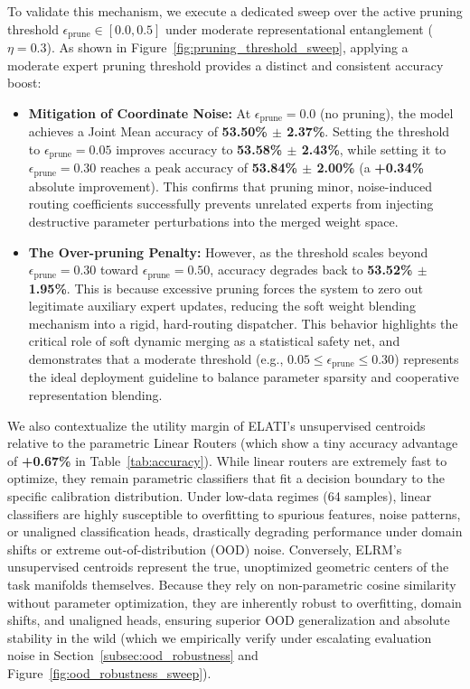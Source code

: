 To validate this mechanism, we execute a dedicated sweep over the active pruning threshold $\epsilon_{\text{prune}} \in [0.0, 0.5]$ under moderate representational entanglement ($\eta = 0.3$). As shown in Figure~\ref{fig:pruning_threshold_sweep}, applying a moderate expert pruning threshold provides a distinct and consistent accuracy boost:
\begin{itemize}
    \item \textbf{Mitigation of Coordinate Noise:} At $\epsilon_{\text{prune}} = 0.0$ (no pruning), the model achieves a Joint Mean accuracy of \textbf{53.50\% $\pm$ 2.37\%}. Setting the threshold to $\epsilon_{\text{prune}} = 0.05$ improves accuracy to \textbf{53.58\% $\pm$ 2.43\%}, while setting it to $\epsilon_{\text{prune}} = 0.30$ reaches a peak accuracy of \textbf{53.84\% $\pm$ 2.00\%} (a \textbf{+0.34\%} absolute improvement). This confirms that pruning minor, noise-induced routing coefficients successfully prevents unrelated experts from injecting destructive parameter perturbations into the merged weight space.
    \item \textbf{The Over-pruning Penalty:} However, as the threshold scales beyond $\epsilon_{\text{prune}} = 0.30$ toward $\epsilon_{\text{prune}} = 0.50$, accuracy degrades back to \textbf{53.52\% $\pm$ 1.95\%}. This is because excessive pruning forces the system to zero out legitimate auxiliary expert updates, reducing the soft weight blending mechanism into a rigid, hard-routing dispatcher. This behavior highlights the critical role of soft dynamic merging as a statistical safety net, and demonstrates that a moderate threshold (e.g., $0.05 \le \epsilon_{\text{prune}} \le 0.30$) represents the ideal deployment guideline to balance parameter sparsity and cooperative representation blending.
\end{itemize}

We also contextualize the utility margin of ELATI's unsupervised centroids relative to the parametric Linear Routers (which show a tiny accuracy advantage of \textbf{+0.67\%} in Table~\ref{tab:accuracy}). While linear routers are extremely fast to optimize, they remain parametric classifiers that fit a decision boundary to the specific calibration distribution. Under low-data regimes (64 samples), linear classifiers are highly susceptible to overfitting to spurious features, noise patterns, or unaligned classification heads, drastically degrading performance under domain shifts or extreme out-of-distribution (OOD) noise. Conversely, ELRM's unsupervised centroids represent the true, unoptimized geometric centers of the task manifolds themselves. Because they rely on non-parametric cosine similarity without parameter optimization, they are inherently robust to overfitting, domain shifts, and unaligned heads, ensuring superior OOD generalization and absolute stability in the wild (which we empirically verify under escalating evaluation noise in Section~\ref{subsec:ood_robustness} and Figure~\ref{fig:ood_robustness_sweep}).

